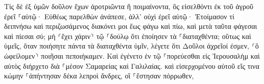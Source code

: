 \documentclass{openreader}
\begin{document}
Τίς δὲ ἐξ ὑμῶν δοῦλον ἔχων ἀροτριῶντα ἢ ποιμαίνοντα, ὃς εἰσελθόντι ἐκ τοῦ ἀγροῦ ἐρεῖ ⸀αὐτῷ· Εὐθέως παρελθὼν ἀνάπεσε, 
ἀλλ’ οὐχὶ ἐρεῖ αὐτῷ· Ἑτοίμασον τί δειπνήσω καὶ περιζωσάμενος διακόνει μοι ἕως φάγω καὶ πίω, καὶ μετὰ ταῦτα φάγεσαι καὶ πίεσαι σύ; 
μὴ ⸂ἔχει χάριν⸃ τῷ ⸀δούλῳ ὅτι ἐποίησεν τὰ ⸀διαταχθέντα; 
οὕτως καὶ ὑμεῖς, ὅταν ποιήσητε πάντα τὰ διαταχθέντα ὑμῖν, λέγετε ὅτι Δοῦλοι ἀχρεῖοί ἐσμεν, ⸂ὃ ὠφείλομεν⸃ ποιῆσαι πεποιήκαμεν. 
Καὶ ἐγένετο ἐν τῷ ⸀πορεύεσθαι εἰς Ἰερουσαλὴμ καὶ αὐτὸς διήρχετο διὰ ⸀μέσον Σαμαρείας καὶ Γαλιλαίας. 
καὶ εἰσερχομένου αὐτοῦ εἴς τινα κώμην ⸀ἀπήντησαν δέκα λεπροὶ ἄνδρες, οἳ ⸀ἔστησαν πόρρωθεν, 
\end{document}
